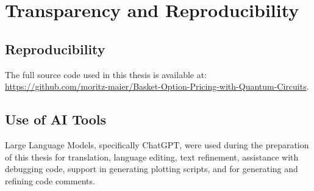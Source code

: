 \chapter*{Transparency and Reproducibility}

\section*{Reproducibility}
The full source code used in this thesis is available at:
\url{https://github.com/moritz-maier/Basket-Option-Pricing-with-Quantum-Circuits}.

\section*{Use of AI Tools}
Large Language Models, specifically ChatGPT, were used during the preparation of this thesis for translation,
language editing, text refinement, assistance with debugging code, support in generating plotting scripts,
and for generating and refining code comments.